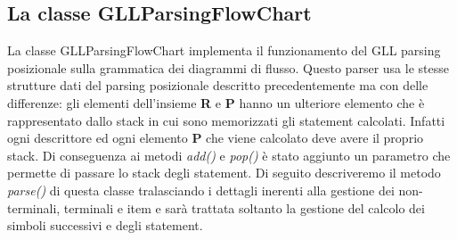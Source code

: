 \subsection{La classe GLLParsingFlowChart}
La classe GLLParsingFlowChart implementa il funzionamento del GLL parsing posizionale sulla grammatica dei diagrammi di flusso. Questo parser usa le stesse strutture dati del parsing posizionale descritto precedentemente ma con delle differenze: gli elementi dell'insieme \textbf{R} e \textbf{P} hanno un ulteriore elemento che è rappresentato dallo stack in cui sono memorizzati gli statement calcolati. Infatti ogni descrittore ed ogni elemento \textbf{P} che viene calcolato deve avere il proprio stack. Di conseguenza ai metodi \textit{add()} e \textit{pop()} è stato aggiunto un parametro che permette di passare lo stack degli statement. Di seguito descriveremo il metodo \textit{parse()} di questa classe tralasciando i dettagli inerenti alla gestione dei non-terminali, terminali e item e sarà trattata soltanto la gestione del calcolo dei simboli successivi e degli statement.
